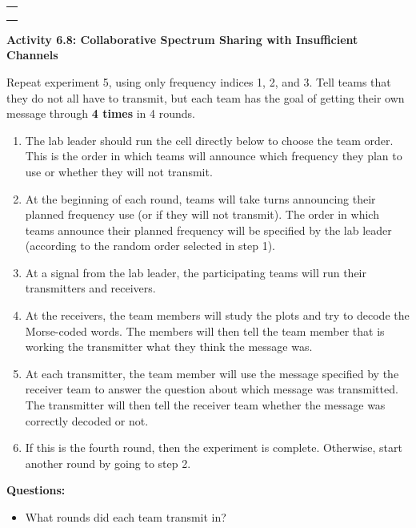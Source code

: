 \documentclass[11pt]{article}
\providecommand{\tightlist}{%
      \setlength{\itemsep}{0pt}\setlength{\parskip}{0pt}}
\begin{document}
\begin{longtable}[]{@{}l@{}}
\toprule
 \\
\midrule
\endhead
 \\
 \\
 \\
\bottomrule
\end{longtable}

    \textbf{Activity 6.8: Collaborative Spectrum Sharing with Insufficient
Channels}

Repeat experiment 5, using only frequency indices 1, 2, and 3. Tell
teams that they do not all have to transmit, but each team has the goal
of getting their own message through \textbf{4 times} in 4 rounds.

\begin{enumerate}
\def\labelenumi{\arabic{enumi}.}
\tightlist
\item
  The lab leader should run the cell directly below to choose the team
  order. This is the order in which teams will announce which frequency
  they plan to use or whether they will not transmit.
\item
  At the beginning of each round, teams will take turns announcing their
  planned frequency use (or if they will not transmit). The order in
  which teams announce their planned frequency will be specified by the
  lab leader (according to the random order selected in step 1).
\item
  At a signal from the lab leader, the participating teams will run
  their transmitters and receivers.
\item
  At the receivers, the team members will study the plots and try to
  decode the Morse-coded words. The members will then tell the team
  member that is working the transmitter what they think the message
  was.
\item
  At each transmitter, the team member will use the message specified by
  the receiver team to answer the question about which message was
  transmitted. The transmitter will then tell the receiver team whether
  the message was correctly decoded or not.
\item
  If this is the fourth round, then the experiment is complete.
  Otherwise, start another round by going to step 2.
\end{enumerate}

\textbf{Questions:}

\begin{itemize}
\tightlist
\item
  What rounds did each team transmit in?
\end{itemize}
\end{document}

